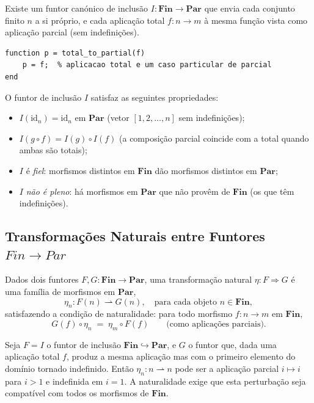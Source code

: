 Existe um funtor canónico de inclusão $I: \mathbf{Fin} \to \mathbf{Par}$ que envia cada conjunto finito $n$ a si próprio, e cada aplicação total $f: n \to m$ à mesma função vista como aplicação parcial (sem indefinições).

\begin{lstlisting}[style=matlab, caption={Funtor de inclusão $I: \mathbf{Fin} \to \mathbf{Par}$}]
function p = total_to_partial(f)
    p = f;  % aplicacao total e um caso particular de parcial
end
\end{lstlisting}

\begin{proposition}
O funtor de inclusão $I$ satisfaz as seguintes propriedades:
\begin{itemize}
    \item $I(\mathrm{id}_n) = \mathrm{id}_n$ em $\mathbf{Par}$ (vetor $[1, 2, \ldots, n]$ sem indefinições);
    \item $I(g \circ f) = I(g) \circ I(f)$ (a composição parcial coincide com a total quando ambas são totais);
    \item $I$ é \emph{fiel}: morfismos distintos em $\mathbf{Fin}$ dão morfismos distintos em $\mathbf{Par}$;
    \item $I$ \emph{não é pleno}: há morfismos em $\mathbf{Par}$ que não provêm de $\mathbf{Fin}$ (os que têm indefinições).
\end{itemize}
\end{proposition}

\subsection{Transformações Naturais entre Funtores $Fin \to Par$}

Dados dois funtores $F, G: \mathbf{Fin} \to \mathbf{Par}$, uma transformação natural $\eta: F \Rightarrow G$ é uma família de morfismos em $\mathbf{Par}$,
\[
    \eta_n: F(n) \rightharpoonup G(n), \quad \text{para cada objeto } n \in \mathbf{Fin},
\]
satisfazendo a condição de naturalidade: para todo morfismo $f: n \to m$ em $\mathbf{Fin}$,
\[
    G(f) \circ \eta_n \;=\; \eta_m \circ F(f) \qquad \text{(como aplicações parciais)}.
\]

\begin{remark}
Seja $F = I$ o funtor de inclusão $\mathbf{Fin} \hookrightarrow \mathbf{Par}$, e $G$ o funtor que, dada uma aplicação total $f$, produz a mesma aplicação mas com o primeiro elemento do domínio tornado indefinido. Então $\eta_n: n \rightharpoonup n$ pode ser a aplicação parcial $i \mapsto i$ para $i > 1$ e indefinida em $i = 1$. A naturalidade exige que esta perturbação seja compatível com todos os morfismos de $\mathbf{Fin}$.
\end{remark}
